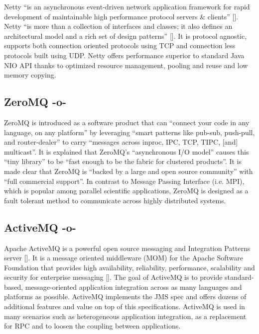 Netty ``is an asynchronous event-driven network application framework
for rapid development of maintainable high performance protocol
servers \& clients'' [\cite{www-netty}]. Netty ``is more than a
collection of interfaces and classes; it also defines an architectural
model and a rich set of design patterns'' [\cite{netty-book}]. It is
protocol agnostic, supports both connection oriented protocols using
TCP and connection less protocols built using UDP. Netty offers
performance superior to standard Java NIO API thanks to optimized
resource management, pooling and reuse and low memory copying.


     
\subsection{ZeroMQ -o-}

     ZeroMQ is introduced as a software product
     that can ``connect your code in any language, on any platform'' by 
     leveraging ``smart patterns like pub-sub, push-pull, and 
     router-dealer'' to carry ``messages across inproc, IPC, TCP, TIPC, 
     [and] multicast''\cite{www-zeromq}. It is explained that
     ZeroMQ's ``asynchronous I/O model'' causes this ``tiny library'' to 
     be ``fast enough to be the fabric for clustered products''\cite{www-zeromq2}.
     It is made clear that ZeroMQ is ``backed by a
     large and open source community'' with ``full commercial
     support''\cite{www-zeromq}.
     In contrast to Message Passing Interface (i.e. MPI), which is 
     popular among parallel scientific applications, ZeroMQ is 
     designed as a fault tolerant method to communicate across highly 
     distributed systems.



\subsection{ActiveMQ -o-}

Apache ActiveMQ is a powerful open source messaging and Integration
Patterns server [\cite{www-activeMQ}]. It is a message oriented
middleware (MOM) for the Apache Software Foundation that provides high
availability, reliability, performance, scalability and security for
enterprise messaging [\cite{ActiveMQ-book}]. The goal of ActiveMQ is to
provide standard-based, message-oriented application integration
across as many languages and platforms as possible. ActiveMQ
implements the JMS spec and offers dozens of additional features and
value on top of this specifications. ActiveMQ is used in many
scenarios such as heterogeneous application integration, as a
replacement for RPC and to loosen the coupling between applications.
     
